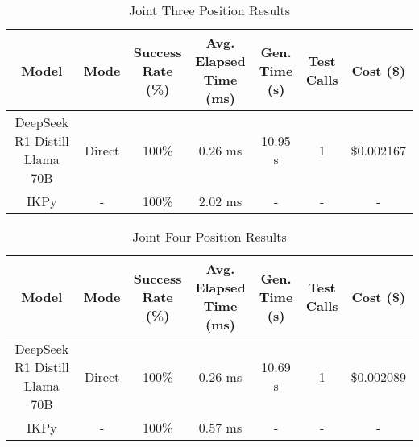 \begin{landscape}
\begin{table}[H]
\tiny
\renewcommand{\arraystretch}{1.2}
\caption{Joint Three Position Results}
\begin{center}
\begin{tabular}{|c|c|c|c|c|c|c|}
    \hline
    \textbf{Model} & 
    \textbf{Mode} & 
    \makecell{\textbf{Success}\\\textbf{Rate (\%)}} &
    \makecell{\textbf{Avg. Elapsed}\\\textbf{Time (ms)}} &
    \makecell{\textbf{Gen.}\\\textbf{Time (s)}} &
    \makecell{\textbf{Test}\\\textbf{Calls}} &
    \textbf{Cost (\$)} \\
    \hline
    DeepSeek R1 Distill Llama 70B & Direct & 100\% & 0.26 ms & 10.95 s & 1 & \$0.002167 \\
    \hline
    IKPy & - & 100\% & 2.02 ms & - & - & - \\
    \hline
\end{tabular}
\label{Results-Position-3-3}
\end{center}
\end{table}

\begin{table}[H]
\tiny
\renewcommand{\arraystretch}{1.2}
\caption{Joint Four Position Results}
\begin{center}
\begin{tabular}{|c|c|c|c|c|c|c|}
    \hline
    \textbf{Model} & 
    \textbf{Mode} & 
    \makecell{\textbf{Success}\\\textbf{Rate (\%)}} &
    \makecell{\textbf{Avg. Elapsed}\\\textbf{Time (ms)}} &
    \makecell{\textbf{Gen.}\\\textbf{Time (s)}} &
    \makecell{\textbf{Test}\\\textbf{Calls}} &
    \textbf{Cost (\$)} \\
    \hline
    DeepSeek R1 Distill Llama 70B & Direct & 100\% & 0.26 ms & 10.69 s & 1 & \$0.002089 \\
    \hline
    IKPy & - & 100\% & 0.57 ms & - & - & - \\
    \hline
\end{tabular}
\label{Results-Position-4-4}
\end{center}
\end{table}


\end{landscape}
